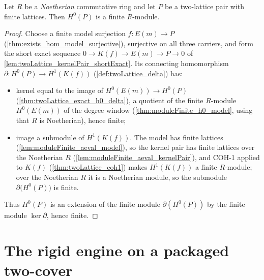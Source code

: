 \begin{theorem}
  \label{thm:twoLattice_coh0}
  \leanok
  Let \(R\) be a \emph{Noetherian} commutative ring and let \(P\) be a two-lattice
  pair with finite lattices. Then \(H^0(P)\) is a finite \(R\)-module.
\end{theorem}
\begin{proof}
  \leanok
  Choose a finite model surjection \(f : E(m) \to P\)
  (\ref{thm:exists_hom_model_surjective}), surjective on all three carriers, and form
  the short exact sequence \(0 \to K(f) \to E(m) \to P \to 0\) of
  \ref{lem:twoLattice_kernelPair_shortExact}. Its connecting homomorphism
  \(\partial : H^0(P) \to H^1(K(f))\) (\ref{def:twoLattice_delta}) has:
  \begin{itemize}
    \item kernel equal to the image of \(H^0(E(m)) \to H^0(P)\)
      (\ref{thm:twoLattice_exact_h0_delta}), a quotient of the finite \(R\)-module
      \(H^0(E(m))\) of the degree window (\ref{thm:moduleFinite_h0_model}, using that
      \(R\) is Noetherian), hence finite;
    \item image a submodule of \(H^1(K(f))\). The model has finite lattices
      (\ref{lem:moduleFinite_aeval_model}), so the kernel pair has finite lattices
      over the Noetherian \(R\) (\ref{lem:moduleFinite_aeval_kernelPair}), and COH-1
      applied to \(K(f)\) (\ref{thm:twoLattice_coh1}) makes \(H^1(K(f))\) a finite
      \(R\)-module; over the Noetherian \(R\) it is a Noetherian module, so the
      submodule \(\partial\bigl(H^0(P)\bigr)\) is finite.
  \end{itemize}
  Thus \(H^0(P)\) is an extension of the finite module \(\partial(H^0(P))\) by the
  finite module \(\ker \partial\), hence finite.
\end{proof}

\section{The rigid engine on a packaged two-cover}
\label{sec:rigid_engine_assembly}

